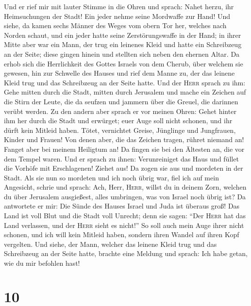  Und er rief mir mit lauter Stimme in die Ohren und
sprach: Nahet herzu, ihr Heimsuchungen der Stadt! Ein jeder nehme seine
Mordwaffe zur Hand!  Und siehe, da kamen sechs Männer des
Weges vom obern Tor her, welches nach Norden schaut, und ein jeder hatte
seine Zerstörungswaffe in der Hand; in ihrer Mitte aber war ein Mann,
der trug ein leinenes Kleid und hatte ein Schreibzeug an der Seite;
diese gingen hinein und stellten sich neben den ehernen Altar.
 Da erhob sich die Herrlichkeit des Gottes Israels von dem
Cherub, über welchem sie gewesen, hin zur Schwelle des Hauses und rief
dem Manne zu, der das leinene Kleid trug und das Schreibzeug an der
Seite hatte.  Und der \textsc{Herr} sprach zu ihm: Gehe
mitten durch die Stadt, mitten durch Jerusalem und mache ein Zeichen auf
die Stirn der Leute, die da seufzen und jammern über die Greuel, die
darinnen verübt werden.  Zu den andern aber sprach er vor
meinen Ohren: Gehet hinter ihm her durch die Stadt und erwürget; euer
Auge soll nicht schonen, und ihr dürft kein Mitleid haben.
 Tötet, vernichtet Greise, Jünglinge und Jungfrauen,
Kinder und Frauen! Von denen aber, die das Zeichen tragen, rühret
niemand an! Fanget aber bei meinem Heiligtum an! Da fingen sie bei den
Ältesten an, die vor dem Tempel waren.  Und er sprach zu
ihnen: Verunreiniget das Haus und füllet die Vorhöfe mit Erschlagenen!
Ziehet aus! Da zogen sie aus und mordeten in der Stadt. 
Als sie nun so mordeten und ich noch übrig war, fiel ich auf mein
Angesicht, schrie und sprach: Ach, Herr, \textsc{Herr}, willst du in
deinem Zorn, welchen du über Jerusalem ausgießest, alles umbringen, was
von Israel noch übrig ist?  Da antwortete er mir: Die
Sünde des Hauses Israel und Juda ist überaus groß! Das Land ist voll
Blut und die Stadt voll Unrecht; denn sie sagen: ``Der \textsc{Herr} hat
das Land verlassen, und der \textsc{Herr} sieht es nicht!''
 So soll auch mein Auge ihrer nicht schonen, und ich will
kein Mitleid haben, sondern ihren Wandel auf ihren Kopf vergelten.
 Und siehe, der Mann, welcher das leinene Kleid trug und
das Schreibzeug an der Seite hatte, brachte eine Meldung und sprach: Ich
habe getan, wie du mir befohlen hast!

\hypertarget{section-9}{%
\section{10}\label{section-9}}

